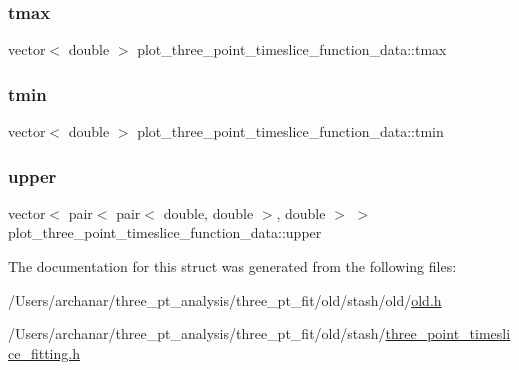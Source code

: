 \mbox{\label{structplot__three__point__timeslice__function__data_a3ad702b7c32060f7ac6c589939b9c97a}} 
\subsubsection{\texorpdfstring{tmax}{tmax}}
{\footnotesize\ttfamily vector$<$ double $>$ plot\+\_\+three\+\_\+point\+\_\+timeslice\+\_\+function\+\_\+data\+::tmax}

\mbox{\label{structplot__three__point__timeslice__function__data_ae81e72c32aa36911997442efd94499b4}} 
\subsubsection{\texorpdfstring{tmin}{tmin}}
{\footnotesize\ttfamily vector$<$ double $>$ plot\+\_\+three\+\_\+point\+\_\+timeslice\+\_\+function\+\_\+data\+::tmin}

\mbox{\label{structplot__three__point__timeslice__function__data_a0935db9c0d1c5daab9e73d0403e7aec6}} 
\subsubsection{\texorpdfstring{upper}{upper}}
{\footnotesize\ttfamily vector$<$ pair$<$ pair$<$ double, double $>$, double $>$ $>$ plot\+\_\+three\+\_\+point\+\_\+timeslice\+\_\+function\+\_\+data\+::upper}



The documentation for this struct was generated from the following files\+:\begin{DoxyCompactItemize}
\item 
/\+Users/archanar/three\+\_\+pt\+\_\+analysis/three\+\_\+pt\+\_\+fit/old/stash/old/\mbox{\hyperlink{old_8h}{old.\+h}}\item 
/\+Users/archanar/three\+\_\+pt\+\_\+analysis/three\+\_\+pt\+\_\+fit/old/stash/\mbox{\hyperlink{old_2stash_2three__point__timeslice__fitting_8h}{three\+\_\+point\+\_\+timeslice\+\_\+fitting.\+h}}\end{DoxyCompactItemize}
